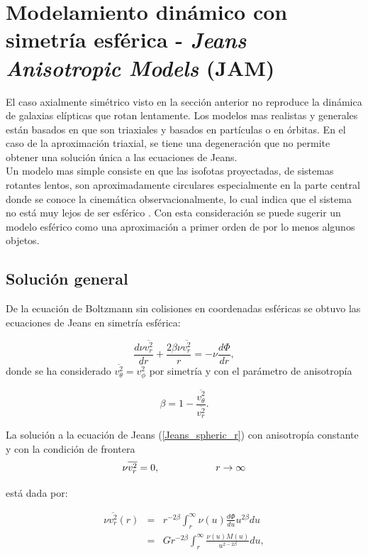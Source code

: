 \section{Modelamiento dinámico con simetría esférica - \emph{Jeans Anisotropic Models} (JAM)}

El caso axialmente simétrico visto en la sección anterior no reproduce la dinámica de galaxias elípticas que rotan lentamente. Los modelos mas realistas y generales están basados en que son triaxiales y basados en partículas o en órbitas. En el caso de la aproximación triaxial, se tiene una degeneración que no permite obtener una solución única a las ecuaciones de Jeans.\\

Un modelo mas simple consiste en que las isofotas proyectadas, de sistemas rotantes lentos, son aproximadamente circulares especialmente en la parte central donde se conoce la cinemática observacionalmente, lo cual indica que el sistema no está muy lejos de ser esférico \cite{2008MNRAS.390_71C}. Con esta consideración se puede sugerir un modelo esférico como una aproximación a primer orden de por lo menos algunos objetos.\\

\subsection{Solución general}

De la ecuación de Boltzmann sin colisiones en coordenadas esféricas se obtuvo las ecuaciones de Jeans en simetría esférica:

\begin{equation}
\label{Jeans_spheric_r}
\frac{d \nu \overline{ v_r^2 } }{ dr } + \frac{2 \beta \nu \overline{ v_r^2 } }{r} = -\nu \frac{ d \Phi }{dr},
\end{equation}
donde se ha considerado $\overline{ v_{\theta}^2 } = \overline{ v_{\phi}^2 }$ por simetría y con el parámetro de anisotropía 

$$\beta = 1- \frac{ \overline{ v_{\theta}^2 } }{ \overline{ v_r^2 } }. $$

La solución a la ecuación de Jeans (\ref{Jeans_spheric_r}) con anisotropía constante y con la condición de frontera
$$ \nu \overline{ v_r^2 } = 0, \hspace{2 cm} r \rightarrow \infty $$

está dada por:

\begin{eqnarray}
\nu \overline{ v_r^2 } (r) &=& r^{-2\beta} \int_r^{\infty} \nu(u) \frac{d\Phi}{du} u^{2\beta} du \\
 &=& G r^{-2\beta} \int_r^{\infty} \frac{\nu(u) M(u) }{ u^{2-2\beta} } du,
\end{eqnarray}

